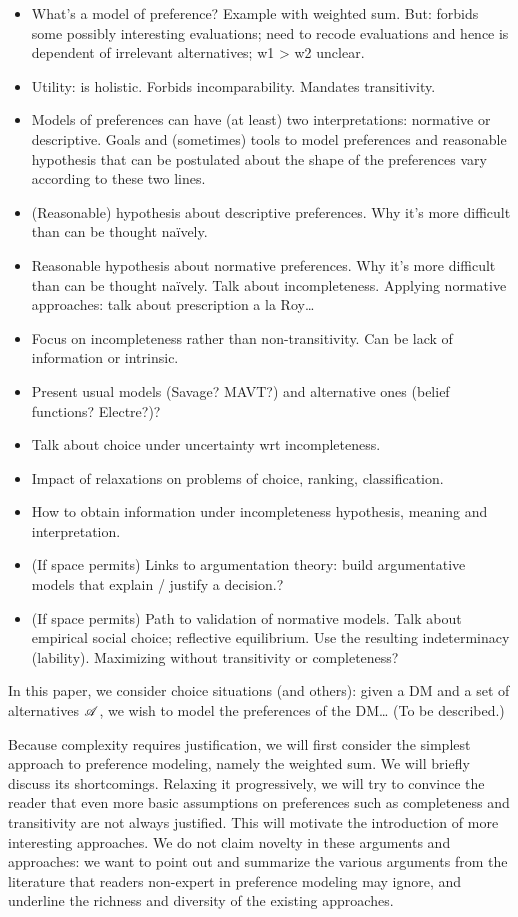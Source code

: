 \documentclass[french, english]{llncs}
\begin{document}
\begin{itemize}
	\item What’s a model of preference? Example with weighted sum. But: forbids some possibly interesting evaluations; need to recode evaluations and hence is dependent of irrelevant alternatives; w1 > w2 unclear.
	\item Utility: is holistic. Forbids incomparability. Mandates transitivity.
	\item Models of preferences can have (at least) two interpretations: normative or descriptive. Goals and (sometimes) tools to model preferences and reasonable hypothesis that can be postulated about the shape of the preferences vary according to these two lines.
	\item (Reasonable) hypothesis about descriptive preferences. Why it’s more difficult than can be thought naïvely. 
	\item Reasonable hypothesis about normative preferences. Why it’s more difficult than can be thought naïvely. Talk about incompleteness. Applying normative approaches: talk about prescription a la Roy…
	\item Focus on incompleteness rather than non-transitivity. Can be lack of information or intrinsic.
	\item Present usual models (Savage? MAVT?) and alternative ones (belief functions? Electre?)?
	\item Talk about choice under uncertainty wrt incompleteness.
	\item Impact of relaxations on problems of choice, ranking, classification.
	\item How to obtain information under incompleteness hypothesis, meaning and interpretation.
	\item (If space permits) Links to argumentation theory: build argumentative models that explain / justify a decision.?
	\item (If space permits) Path to validation of normative models. Talk about empirical social choice; reflective equilibrium. Use the resulting indeterminacy (lability). Maximizing without transitivity or completeness?
\end{itemize}

In this paper, we consider choice situations (and others): given a \ac{DM} and a set of alternatives $\mathscr{A}$, we wish to model the preferences of the \ac{DM}… (To be described.)

Because complexity requires justification, we will first consider the simplest approach to preference modeling, namely the weighted sum. We will briefly discuss its shortcomings. Relaxing it progressively, we will try to convince the reader that even more basic assumptions on preferences such as completeness and transitivity are not always justified. This will motivate the introduction of more interesting approaches. We do not claim novelty in these arguments and approaches: we want to point out and summarize the various arguments from the literature that readers non-expert in preference modeling may ignore, and underline the richness and diversity of the existing approaches. 
\end{document}

